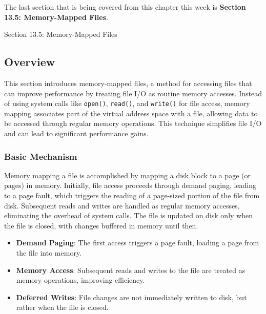 The last section that is being covered from this chapter this week is \textbf{Section 13.5: Memory-Mapped Files}.

\begin{notes}{Section 13.5: Memory-Mapped Files}
    \subsection*{Overview}

    This section introduces memory-mapped files, a method for accessing files that can improve performance by treating file I/O as routine memory accesses. Instead of using system calls like \texttt{open()}, \texttt{read()}, and \texttt{write()} for file access, memory mapping associates part of the virtual address space with a file, allowing data to be accessed through regular memory operations. This technique simplifies file I/O and can lead to significant performance gains.
    
    \subsubsection*{Basic Mechanism}
    
    Memory mapping a file is accomplished by mapping a disk block to a page (or pages) in memory. Initially, file access proceeds through demand paging, leading to a page fault, which triggers the reading of a page-sized portion of the file from disk. Subsequent reads and writes are handled as regular memory accesses, eliminating the overhead of system calls. The file is updated on disk only when the file is closed, with changes buffered in memory until then.
    
    \begin{highlight}
    
        \begin{itemize}
            \item \textbf{Demand Paging}: The first access triggers a page fault, loading a page from the file into memory.
            \item \textbf{Memory Access}: Subsequent reads and writes to the file are treated as memory operations, improving efficiency.
            \item \textbf{Deferred Writes}: File changes are not immediately written to disk, but rather when the file is closed.
        \end{itemize}
    
    \end{highlight}
    

\end{notes}
